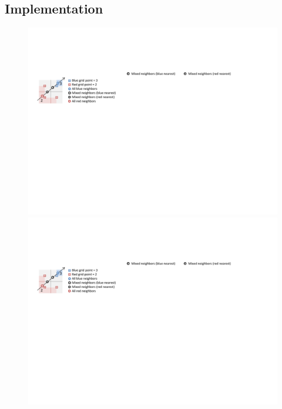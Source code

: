 \documentclass{egpubl}
\begin{document}
\subsection{Implementation}


\begin{figure}
\centering
\begin{minipage}{0.44\linewidth}
\includegraphics[width=1.0\linewidth]{figures/Neighborhood_all}
\end{minipage}\hfill
\begin{minipage}{0.27\linewidth}
\begin{minipage}{1.0\linewidth}
\includegraphics[width=1.0\linewidth]{figures/Neighborhood_red}

\end{minipage}
\end{minipage}
\end{figure}
\end{document}
